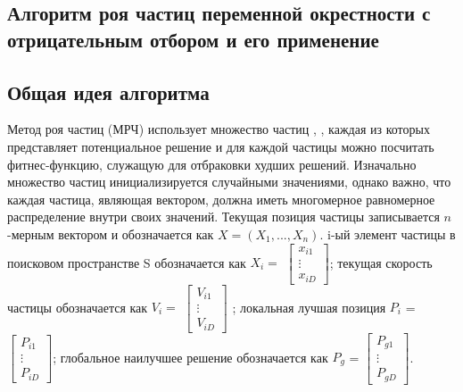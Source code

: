 \parindent=1cm %

\begin{center}
		
		\section{Алгоритм роя частиц  переменной окрестности  с отрицательным отбором и его применение}
		
\end{center}

\subsection{Общая идея алгоритма}

Метод роя частиц (МРЧ) использует множество частиц \cite{Eberhart:1995}, \cite{Kondratiev:2010}, каждая из которых представляет потенциальное решение и для каждой частицы можно посчитать фитнес-функцию, служащую для отбраковки худших решений. Изначально множество частиц инициализируется случайными значениями, однако важно, что каждая частица, являющая вектором, должна иметь многомерное равномерное распределение внутри своих значений. Текущая позиция частицы записывается $n$-мерным вектором и обозначается как $X=(X_1,...,X_n)$. i-ый элемент  частицы  в поисковом пространстве S обозначается как $X_i=$ $\begin{bmatrix}
	x_{i1} \\
	
	\vdots \\
	
	x_{iD}
\end{bmatrix}$; текущая скорость частицы обозначается как $V_i=$ 
$\begin{bmatrix}
V_{i1} \\ 

\vdots \\

V_{iD}
\end{bmatrix}$ ; локальная лучшая позиция $P_i$ = $\begin{bmatrix}
P_{i1} 	\\ 

\vdots	\\

P_{iD}
\end{bmatrix}$; глобальное наилучшее решение обозначается как $P_g$ = $\begin{bmatrix}
P_{g1} \\
\vdots \\
P_{gD}	
\end{bmatrix}$. 

